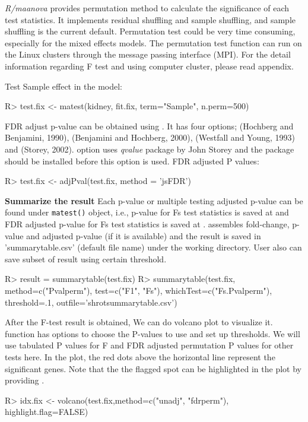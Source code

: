 {\em R/maanova} provides permutation method to calculate the significance of
each test statistics. It implements residual shuffling and sample shuffling,
and sample shuffling is the current default. Permutation test could be very
time consuming, especially for the mixed effects models. The permutation
test function can run on the Linux clusters through the message passing 
interface (MPI). For the detail information regarding F test and 
using computer cluster, please read appendix. 

Test Sample effect in the model:
\begin{Sinput}
R> test.fix <- matest(kidney, fit.fix, term="Sample", n.perm=500)
\end{Sinput}

FDR adjust p-value can be obtained using . It has four
  options;   (Hochberg and Benjamini, 1990),  (Benjamini and Hochberg, 2000), 
  (Westfall and Young, 1993) and  (Storey,
  2002).  option uses {\em qvalue} package by John
  Storey and the package should be installed before this option
  is used. FDR adjusted P values:
\begin{Sinput}
R> test.fix <- adjPval(test.fix, method = 'jsFDR')
\end{Sinput}
{\bf Summarize the result} Each p-value or multiple testing adjusted p-value
can be found under {\tt matest()} object, i.e., p-value for Fs test statistics is
saved at  and FDR adjusted p-value for Fs
test statistics is saved at .  assembles
fold-change, p-value and adjusted p-value (if it is available) and the result
is saved in 'summarytable.csv' (default file name) under the working directory. User also can save subset of result using certain threshold.  
\begin{Sinput}
R> result = summarytable(test.fix)
R> summarytable(test.fix, method=c("Pvalperm"), test=c("F1", "Fs"),
whichTest=c("Fs.Pvalperm"), threshold=.1, outfile='shrotsummarytable.csv')
\end{Sinput}

After the F-test result is obtained, We can do volcano plot
to visualize it.  function has options to 
choose the P-values to use and set up thresholds. We will
use tabulated P values for F and FDR adjusted permutation 
P values for other tests here. 
In the plot, the red dots above the horizontal line represent
the significant genes. 
Note that the the flagged spot can be highlighted in the plot by providing .
\begin{Sinput}
R> idx.fix <- volcano(test.fix,method=c("unadj", "fdrperm"),
         highlight.flag=FALSE)
\end{Sinput}

